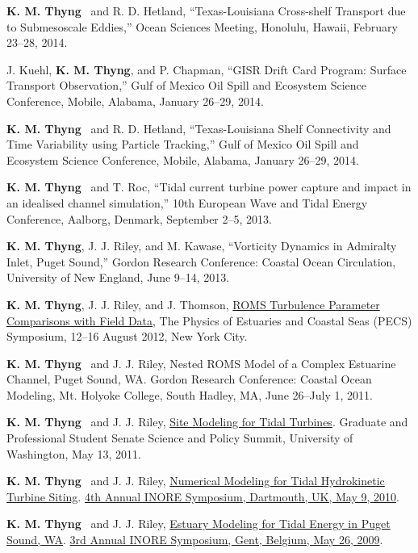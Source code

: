 \documentclass[10pt,letterpaper]{article}
\newcommand{\kmt}{\textbf{K. M. Thyng}}
\renewenvironment{itemize}{
  \begin{list}{}{
    \setlength{\leftmargin}{1.5em}
    \setlength{\itemsep}{0.25em}
    \setlength{\parskip}{0pt}
    \setlength{\parsep}{0.25em}
  }
}{
  \end{list}
}
\begin{document}
\begin{itemize}
\item \kmt~ and R. D. Hetland, ``Texas-Louisiana Cross-shelf Transport due to Submesoscale Eddies,'' Ocean Sciences Meeting, Honolulu, Hawaii, February 23--28, 2014.

\item J. Kuehl, \kmt, and P. Chapman, ``GISR Drift Card Program: Surface Transport Observation,'' Gulf of Mexico Oil Spill and Ecosystem Science Conference, Mobile, Alabama, January 26--29, 2014.

\item \kmt~ and R. D. Hetland, ``Texas-Louisiana Shelf Connectivity and Time Variability using Particle Tracking,'' Gulf of Mexico Oil Spill and Ecosystem Science Conference, Mobile, Alabama, January 26--29, 2014.

\item \kmt~ and T. Roc, ``Tidal current turbine power capture and impact in an idealised channel simulation,'' 10th European Wave and Tidal Energy Conference, Aalborg, Denmark, September 2--5, 2013.

\item \kmt, J. J. Riley, and M. Kawase, ``Vorticity Dynamics in Admiralty Inlet, Puget Sound,'' Gordon Research Conference: Coastal Ocean Circulation, University of New England, June 9--14, 2013.

\item \kmt, J. J. Riley, and J. Thomson, \href{http://pong.tamu.edu/~kthyng/posters/pecs.pdf}{ROMS Turbulence Parameter Comparisons with Field Data}, The Physics of Estuaries and Coastal Seas (PECS) Symposium, 12--16 August 2012, New York City.

\item \kmt~ and J. J. Riley, Nested ROMS Model of a Complex Estuarine Channel, Puget Sound, WA. Gordon Research Conference: Coastal Ocean Modeling,
  Mt. Holyoke College, South Hadley,  MA,
  June 26--July 1, 2011.

\item \kmt~ and J. J. Riley, \href{http://froude.me.washington.edu/presentations/GPSS051311.pdf}{Site Modeling for Tidal Turbines}. Graduate and Professional Student Senate Science and Policy Summit, University of Washington, May 13, 2011.

\item \kmt~ and J. J. Riley, \href{http://froude.me.washington.edu/presentations/InorePoster2010/inore.pdf}{Numerical Modeling for Tidal
Hydrokinetic Turbine Siting}. \href{http://www.inore.org}{4th Annual INORE Symposium, Dartmouth, UK, May 9, 2010}.

\item \kmt~ and J. J. Riley, \href{http://froude.me.washington.edu/presentations/inore_poster2009.pdf}{Estuary Modeling for Tidal Energy in Puget Sound, WA}. \href{http://www.inore.org}{3rd Annual INORE Symposium, Gent, Belgium, May 26, 2009}.

\end{itemize}
\end{document}
